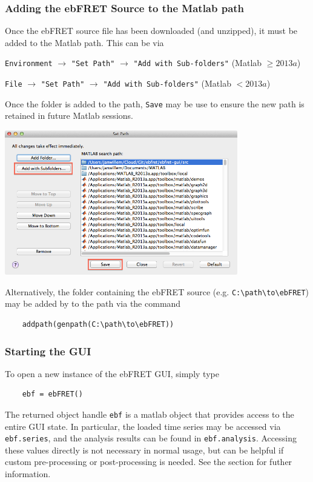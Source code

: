 \documentclass[12pt,article,oldfontcommands]{memoir}
\newcommand{\indt}{\qquad}
\begin{document}
\subsubsection{Adding the ebFRET Source to the Matlab path}

Once the ebFRET source file has been downloaded (and unzipped), it must be added to the Matlab path. This can be via 

\indt\texttt{Environment} $\to$ \texttt{"Set Path"} $\to$ \texttt{"Add with Sub-folders"} (Matlab $\ge 2013a$)


\indt\texttt{File} $\to$ \texttt{"Set Path"} $\to$ \texttt{"Add with Sub-folders"} (Matlab $< 2013a$)


 Once the folder is added to the path, \texttt{Save} may be use to ensure the new path is retained in future Matlab sessions. 

\indt\includegraphics[width=4in]{images/matlab_2013a_set_path_dialog}


 Alternatively, the folder containing the ebFRET source 
(e.g. \verb|C:\path\to\ebFRET|) may be added by to the path via the command
\begin{verbatim}
    addpath(genpath(C:\path\to\ebFRET))
\end{verbatim}

\subsubsection{Starting the GUI}

To open a new instance of the ebFRET GUI, simply type
\begin{verbatim}
    ebf = ebFRET()
\end{verbatim}
The returned object handle \texttt{ebf} is a matlab object that provides access to the entire GUI state. In particular, the loaded time series may be accessed via \texttt{ebf.series}, and the analysis results can be found in \texttt{ebf.analysis}. Accessing these values directly is not necessary in normal usage, but can be helpful if custom pre-processing or post-processing is needed. See the \emph{} section for futher information.
\end{document}
